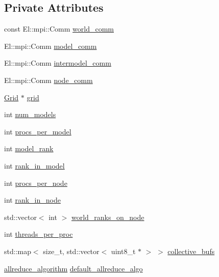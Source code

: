 \subsection*{Private Attributes}
\begin{DoxyCompactItemize}
\item 
const El\+::mpi\+::\+Comm \hyperlink{classlbann_1_1lbann__comm_a1fc59c935580eab2ce8e60464a45ef39}{world\+\_\+comm}
\item 
El\+::mpi\+::\+Comm \hyperlink{classlbann_1_1lbann__comm_a58a75b76bd61ec8a26c1cbbec3dc2f45}{model\+\_\+comm}
\item 
El\+::mpi\+::\+Comm \hyperlink{classlbann_1_1lbann__comm_a2c51c5d8faf4f0ab4f43b892c55e597b}{intermodel\+\_\+comm}
\item 
El\+::mpi\+::\+Comm \hyperlink{classlbann_1_1lbann__comm_a8aeb530ae4cedfa4d1141bb9c4704e6c}{node\+\_\+comm}
\item 
\hyperlink{base_8hpp_a9951bb1719d534e0401b1f06cad19eab}{Grid} $\ast$ \hyperlink{classlbann_1_1lbann__comm_a29fb31be115db3225b145f250a7778d9}{grid}
\item 
int \hyperlink{classlbann_1_1lbann__comm_a256ff5a0bafb33f43784ffc8dd2d29cf}{num\+\_\+models}
\item 
int \hyperlink{classlbann_1_1lbann__comm_a7cb55d127259d7ed9f07ccde6f4ebd8c}{procs\+\_\+per\+\_\+model}
\item 
int \hyperlink{classlbann_1_1lbann__comm_a1f3f90a996dbba4cd1cca60596933ea3}{model\+\_\+rank}
\item 
int \hyperlink{classlbann_1_1lbann__comm_a0dcccd57c2b591eb7682e192e0a09033}{rank\+\_\+in\+\_\+model}
\item 
int \hyperlink{classlbann_1_1lbann__comm_a2ffc59f0c1d97df2ca6845312c8c8b3e}{procs\+\_\+per\+\_\+node}
\item 
int \hyperlink{classlbann_1_1lbann__comm_abb5c8b008b5cac11702bf1f991c78ab0}{rank\+\_\+in\+\_\+node}
\item 
std\+::vector$<$ int $>$ \hyperlink{classlbann_1_1lbann__comm_a3299a37fe7b0eae43a5c154148ab6dc2}{world\+\_\+ranks\+\_\+on\+\_\+node}
\item 
int \hyperlink{classlbann_1_1lbann__comm_a23ff8e3563e4472af29d15f6cb823bc1}{threads\+\_\+per\+\_\+proc}
\item 
std\+::map$<$ size\+\_\+t, std\+::vector$<$ uint8\+\_\+t $\ast$ $>$ $>$ \hyperlink{classlbann_1_1lbann__comm_a9ada8c5daf902f43b599234c7519a765}{collective\+\_\+bufs}
\item 
\hyperlink{classlbann_1_1lbann__comm_a02a03227cc27e3516f0d9f9812f32019}{allreduce\+\_\+algorithm} \hyperlink{classlbann_1_1lbann__comm_ac7731d6bcdb6775009467cf4138d4bab}{default\+\_\+allreduce\+\_\+algo}

\end{DoxyCompactItemize}
